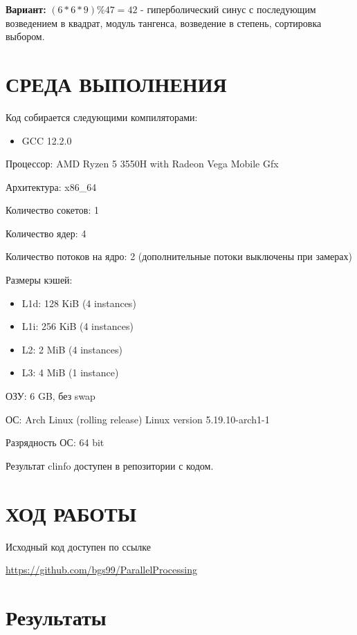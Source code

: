 \documentclass[14pt, a4paper, oneside, final]{extarticle}
\begin{document}
\textbf{Вариант:} $(6*6*9) \% 47 = 42$ - гиперболический синус с последующим возведением в квадрат, модуль тангенса, возведение в степень, сортировка выбором.

\clearpage
\section*{СРЕДА ВЫПОЛНЕНИЯ}

Код собирается следующими компиляторами:
\begin{itemize}
 \setlength{\itemindent}{3em}
 \item GCC 12.2.0
\end{itemize}

Процессор: AMD Ryzen 5 3550H with Radeon Vega Mobile Gfx

Архитектура: x86\_64

Количество сокетов: 1

Количество ядер: 4

Количество потоков на ядро: 2 (дополнительные потоки выключены при замерах)

Размеры кэшей:
\begin{itemize}
 \setlength{\itemindent}{3em}
 \item L1d: 128 KiB (4 instances)
 \item L1i: 256 KiB (4 instances)
 \item L2: 2 MiB (4 instances)
 \item L3: 4 MiB (1 instance)
\end{itemize}

ОЗУ: 6 GB, без swap

ОС: Arch Linux (rolling release) Linux version 5.19.10-arch1-1

Разрядность ОС: 64 bit

Результат clinfo доступен в репозитории с кодом.

\clearpage
\section*{ХОД РАБОТЫ}
Исходный код доступен по ссылке

\url{https://github.com/bgs99/ParallelProcessing}

\clearpage

\section*{Результаты}
\end{document}
